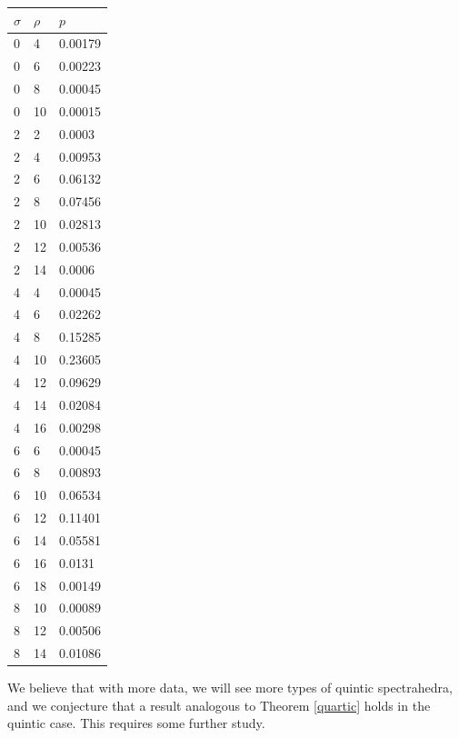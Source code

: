 \documentclass[12pt]{amsart}
\theoremstyle{plain}
\theoremstyle{definition}
\begin{document}
\begin{center}
\begin{tabular}{| l | l | l |} 
	$\sigma$ & $\rho$ & $p$ \\ \hline
	0 & 4 & 0.00179    \\
	0 & 6 & 0.00223    \\
	0 & 8 & 0.00045    \\
	0 & 10 & 0.00015    \\
	2 & 2 & 0.0003    \\
	2 & 4 & 0.00953    \\
	2 & 6 & 0.06132    \\
	2 & 8 & 0.07456    \\
	2 & 10 & 0.02813    \\
	2 & 12 & 0.00536    \\
	2 & 14 & 0.0006    \\
	4 & 4 & 0.00045    \\
	4 & 6 & 0.02262    \\
	4 & 8 & 0.15285    \\
	4 & 10 & 0.23605    \\
	4 & 12 & 0.09629    \\
	4 & 14 & 0.02084    \\
	4 & 16 & 0.00298    \\
	6 & 6 & 0.00045    \\
	6 & 8 & 0.00893    \\
	6 & 10 & 0.06534    \\
	6 & 12 & 0.11401    \\
	6 & 14 & 0.05581    \\
	6 & 16 & 0.0131    \\
	6 & 18 & 0.00149    \\
	8 & 10 & 0.00089    \\
	8 & 12 & 0.00506    \\
	8 & 14 & 0.01086    \\ \hline
\end{tabular} 
\end{center}

We believe that with more data, we will see more types of quintic spectrahedra,
and we conjecture that a result analogous to Theorem \ref{quartic} holds in the
quintic case. This requires some further study.




\nocite{*}
\end{document}
